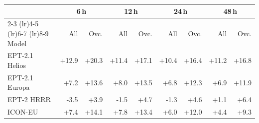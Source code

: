 \begin{tabular}{@{}l*{8}{r}@{}}
\toprule
& \multicolumn{2}{c}{6\,h} & \multicolumn{2}{c}{12\,h} & \multicolumn{2}{c}{24\,h} & \multicolumn{2}{c}{48\,h} \\
\cmidrule(lr){2-3} \cmidrule(lr){4-5} \cmidrule(lr){6-7} \cmidrule(lr){8-9}
Model & All & Ovc. & All & Ovc. & All & Ovc. & All & Ovc. \\
\midrule
EPT-2.1 Helios & +12.9 & +20.3 & +11.4 & +17.1 & +10.4 & +16.4 & +11.2 & +16.8 \\\addlinespace[0.3em]
EPT-2.1 Europa & +7.2 & +13.6 & +8.0 & +13.5 & +6.8 & +12.3 & +6.9 & +11.9 \\\addlinespace[0.3em]
EPT-2 HRRR & -3.5 & +3.9 & -1.5 & +4.7 & -1.3 & +4.6 & +1.1 & +6.4 \\\addlinespace[0.3em]
ICON-EU & +7.4 & +14.1 & +7.8 & +13.4 & +6.0 & +12.0 & +4.4 & +9.3 \\
\bottomrule
\end{tabular}
